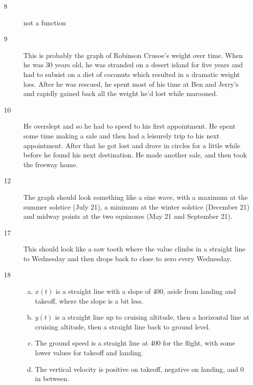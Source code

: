 \documentclass[letterpaper]{exam}
\begin{document}
\begin{description}
      \item[8] not a function

      \item[9] This is probably the graph of Robinson Crusoe's weight over time.
        When he was 30 years old, he was stranded on a desert island for five
        years and had to subsist on a diet of coconuts which resulted in a
        dramatic weight loss. After he was rescued, he spent most of his time
        at Ben and Jerry's and rapidly gained back all the weight he'd lost
        while marooned.

      \item[10]
        He overslept and so he had to speed to his first appointment. He spent
        some time making a sale and then had a leisurely trip to his next
        appointment. After that he got lost and drove in circles for a little
        while before he found his next destination. He made another sale, and
        then took the freeway home.

      \item[12] The graph should look something like a sine wave, with a maximum at
        the summer solstice (July 21), a minimum at the winter solstice
        (December 21) and midway points at the two equinoxes (May 21 and
        September 21).

      \item[17] This should look like a saw tooth where the value climbs in a
        straight line to Wednesday and then drops back to close to zero every
        Wednesday.

      \item[18]
        \begin{enumerate}[(a)]
          \item $x(t)$ is a straight line with a slope of 400, aside from
            landing and takeoff, where the slope is a bit less.

          \item $y(t)$ is a straight line up to cruising altitude, then a
            horizontal line at cruising altitude, then a straight line back to
            ground level.

          \item The ground speed is a straight line at 400 for the flight, with
            some lower values for takeoff and landing.

          \item The vertical velocity is positive on takeoff, negative on
            landing, and 0 in between.
        \end{enumerate}


\end{description}
\end{document}
